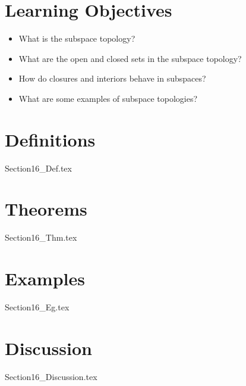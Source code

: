 \section{Learning Objectives}

\begin{itemize}
    \item What is the subspace topology?
    \item What are the open and closed sets in the subspace topology?
    \item How do closures and interiors behave in subspaces?
    \item What are some examples of subspace topologies?
\end{itemize}

\section{Definitions}

{Section16_Def.tex}

\section{Theorems}

{Section16_Thm.tex}

\section{Examples}

{Section16_Eg.tex}

\section{Discussion}

{Section16_Discussion.tex}